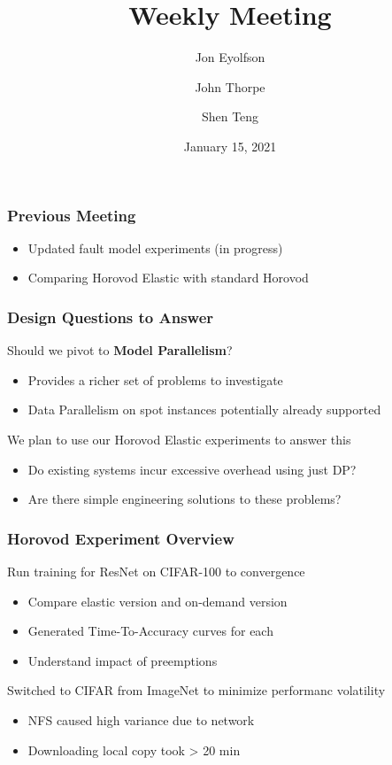 
\title{Weekly Meeting}
\date{January 15, 2021}
\author{Jon Eyolfson \and John Thorpe \and Shen Teng}



  \begin{frame}[plain]
    \titlepage
  \end{frame}

  \setcounter{framenumber}{0}

  \begin{frame}
    \frametitle{Previous Meeting}

    \begin{itemize}
      \item Updated fault model experiments (in progress)
      \item Comparing Horovod Elastic with standard Horovod
    \end{itemize}
  \end{frame}

  \begin{frame}
    \frametitle{Design Questions to Answer}

    Should we pivot to \textbf{Model Parallelism}?
    \begin{itemize}
      \item Provides a richer set of problems to investigate
      \item Data Parallelism on spot instances potentially already supported
    \end{itemize}

    \vspace{2em}
    We plan to use our Horovod Elastic experiments to answer this
    \begin{itemize}
      \item Do existing systems incur excessive overhead using just DP?
      \item Are there simple engineering solutions to these problems?
    \end{itemize}
  \end{frame}

  \begin{frame}
    \frametitle{Horovod Experiment Overview}

    Run training for ResNet on CIFAR-100 to convergence
    \begin{itemize}
      \item Compare elastic version and on-demand version
      \item Generated Time-To-Accuracy curves for each
      \item Understand impact of preemptions
    \end{itemize}

    \vspace{2em}
    Switched to CIFAR from ImageNet to minimize performanc volatility
    \begin{itemize}
      \item NFS caused high variance due to network
      \item Downloading local copy took > 20 min
    \end{itemize}
  \end{frame}

